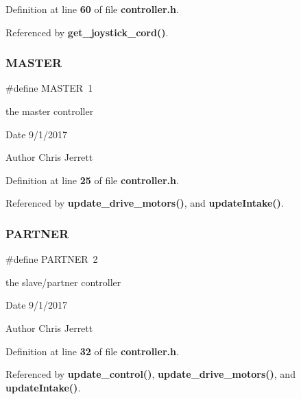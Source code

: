 Definition at line \textbf{ 60} of file \textbf{ controller.\+h}.



Referenced by \textbf{ get\+\_\+joystick\+\_\+cord()}.

\mbox{\label{controller_8h_a3fa2d3bf1901157f734a584d47b25d8b}} 
\subsubsection{M\+A\+S\+T\+ER}
{\footnotesize\ttfamily \#define M\+A\+S\+T\+ER~1}



the master controller 

\begin{DoxyDate}{Date}
9/1/2017 
\end{DoxyDate}
\begin{DoxyAuthor}{Author}
Chris Jerrett 
\end{DoxyAuthor}


Definition at line \textbf{ 25} of file \textbf{ controller.\+h}.



Referenced by \textbf{ update\+\_\+drive\+\_\+motors()}, and \textbf{ update\+Intake()}.

\mbox{\label{controller_8h_a136e64cf351535da81cacb6a546cade6}} 
\subsubsection{P\+A\+R\+T\+N\+ER}
{\footnotesize\ttfamily \#define P\+A\+R\+T\+N\+ER~2}



the slave/partner controller 

\begin{DoxyDate}{Date}
9/1/2017 
\end{DoxyDate}
\begin{DoxyAuthor}{Author}
Chris Jerrett 
\end{DoxyAuthor}


Definition at line \textbf{ 32} of file \textbf{ controller.\+h}.



Referenced by \textbf{ update\+\_\+control()}, \textbf{ update\+\_\+drive\+\_\+motors()}, and \textbf{ update\+Intake()}.

